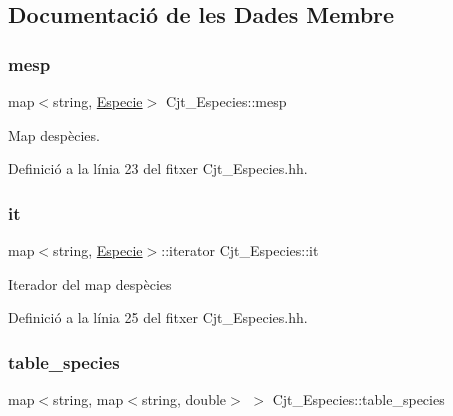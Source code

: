 \subsection{Documentació de les Dades Membre}
\mbox{\label{class_cjt___especies_a64a525b38c78935e7432b362ea9a2306}} 
\subsubsection{\texorpdfstring{mesp}{mesp}}
{\footnotesize\ttfamily map$<$string, \hyperlink{class_especie}{Especie}$>$ Cjt\+\_\+\+Especies\+::mesp\hspace{0.3cm}{\ttfamily [private]}}



Map d\textquotesingle{}espècies. 



Definició a la línia 23 del fitxer Cjt\+\_\+\+Especies.\+hh.

\mbox{\label{class_cjt___especies_a25b19415a21bdabe9e2fc2ad7d2f68a5}} 
\subsubsection{\texorpdfstring{it}{it}}
{\footnotesize\ttfamily map$<$string, \hyperlink{class_especie}{Especie}$>$\+::iterator Cjt\+\_\+\+Especies\+::it\hspace{0.3cm}{\ttfamily [private]}}

Iterador del map d\textquotesingle{}espècies 

Definició a la línia 25 del fitxer Cjt\+\_\+\+Especies.\+hh.

\mbox{\label{class_cjt___especies_ae56d242080836b8d3db505f0a8623090}} 
\subsubsection{\texorpdfstring{table\+\_\+species}{table\_species}}
{\footnotesize\ttfamily map$<$string, map$<$string, double$>$ $>$ Cjt\+\_\+\+Especies\+::table\+\_\+species\hspace{0.3cm}{\ttfamily [private]}}



